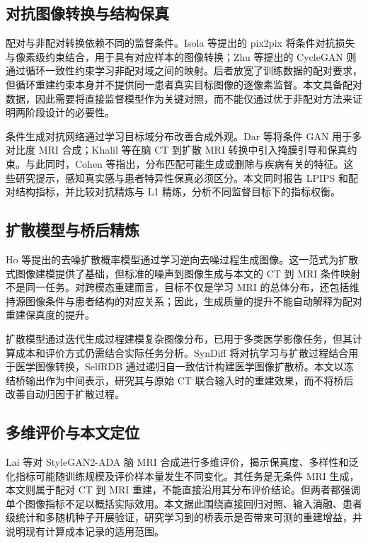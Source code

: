 \documentclass[UTF8,11pt,a4paper]{ctexart}
\begin{document}
\subsection{对抗图像转换与结构保真}
配对与非配对转换依赖不同的监督条件。Isola 等提出的 pix2pix 将条件对抗损失与像素级约束结合，用于具有对应样本的图像转换\cite{isola2017}；Zhu 等提出的 CycleGAN 则通过循环一致性约束学习非配对域之间的映射\cite{zhu2017}。后者放宽了训练数据的配对要求，但循环重建约束本身并不提供同一患者真实目标图像的逐像素监督。本文具备配对数据，因此需要将直接监督模型作为关键对照，而不能仅通过优于非配对方法来证明两阶段设计的必要性。

条件生成对抗网络通过学习目标域分布改善合成外观。Dar 等将条件 GAN 用于多对比度 MRI 合成\cite{dar2019}；Khalil 等在脑 CT 到扩散 MRI 转换中引入掩膜引导和保真约束\cite{khalil2025}。与此同时，Cohen 等指出，分布匹配可能生成或删除与疾病有关的特征\cite{cohen2018}。这些研究提示，感知真实感与患者特异性保真必须区分。本文同时报告 LPIPS 和配对结构指标，并比较对抗精炼与 L1 精炼，分析不同监督目标下的指标权衡。

\subsection{扩散模型与桥后精炼}
Ho 等提出的去噪扩散概率模型通过学习逆向去噪过程生成图像\cite{ho2020}。这一范式为扩散式图像建模提供了基础，但标准的噪声到图像生成与本文的 CT 到 MRI 条件映射不是同一任务。对跨模态重建而言，目标不仅是学习 MRI 的总体分布，还包括维持源图像条件与患者结构的对应关系；因此，生成质量的提升不能自动解释为配对重建保真度的提升。

扩散模型通过迭代生成过程建模复杂图像分布，已用于多类医学影像任务，但其计算成本和评价方式仍需结合实际任务分析\cite{kazerouni2023}。SynDiff 将对抗学习与扩散过程结合用于医学图像转换\cite{ozbey2023}，SelfRDB 通过递归自一致估计构建医学图像扩散桥\cite{arslan2025}。本文以冻结桥输出作为中间表示，研究其与原始 CT 联合输入时的重建效果，而不将桥后改善自动归因于扩散过程。

\subsection{多维评价与本文定位}
Lai 等对 StyleGAN2-ADA 脑 MRI 合成进行多维评价，揭示保真度、多样性和泛化指标可能随训练规模及评价样本量发生不同变化\cite{lai2026}。其任务是无条件 MRI 生成，本文则属于配对 CT 到 MRI 重建，不能直接沿用其分布评价结论。但两者都强调单个图像指标不足以概括实际效用。本文据此围绕直接回归对照、输入消融、患者级统计和多随机种子开展验证，研究学习到的桥表示是否带来可测的重建增益，并说明现有计算成本记录的适用范围。
\end{document}
